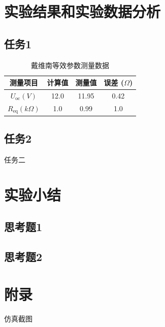 \documentclass[12pt, a4paper]{article}
\begin{document}
\newpage

\section{实验结果和实验数据分析}

\subsection{任务1}

\begin{table}[htbp]
    \centering
    \caption{戴维南等效参数测量数据}
    \begin{tabular}{cccc}
        \toprule
        \textbf{测量项目} & \textbf{计算值} & \textbf{测量值} & \textbf{误差 ($\Omega$)} \\
        \midrule
        $U_{\text{oc}} (V)$ & 12.0 & 11.95 & 0.42 \\
        $R_{\text{eq}} (k\Omega)$ & 1.0 & 0.99 & 1.0 \\
        \bottomrule
    \end{tabular}
\end{table}

\subsection{任务2}

任务二

\newpage

\section{实验小结}
\subsection{思考题1}
\subsection{思考题2}

\newpage

\section{附录}
仿真截图
\end{document}
